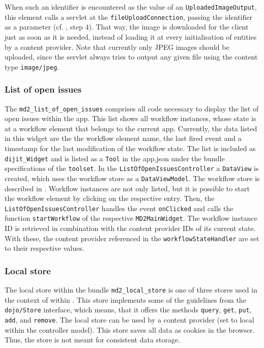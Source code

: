 When such an identifier is encountered as the value of an \lstinline|UploadedImageOutput|, this element calls a servlet at the \lstinline|fileUploadConnection|, passing the identifier as a parameter (cf. , step 4). That way, the image is downloaded for the client just as soon as it is needed, instead of loading it at every initialisation of entities by a content provider. Note that currently only JPEG images should be uploaded, since the servlet always tries to output any given file using the content type \lstinline|image/jpeg|.



\subsubsection{List of open issues}
\label{sec:listOfOpenIssues}

The \lstinline!md2_list_of_open_issues! comprises all code necessary to display the list of open issues within the app. This list shows all workflow instances, whose state is at a workflow element that belongs to the current app. Currently, the data listed in this widget are the the workflow element name, the last fired event and a timestamp for the last modification of the workflow state. 
The list is included as \lstinline!dijit_Widget! and is listed as a \lstinline!Tool! in the app.json under the bundle specifications of the \lstinline!toolset!. In the \lstinline!ListOfOpenIssuesController! a \lstinline!DataView! is created, which uses the workflow store as a \lstinline!DataViewModel!. The workflow store is described in .
Workflow instances are not only listed, but it is possible to start the workflow element by clicking on the respective entry. Then, the \lstinline!ListOfOpenIssuesController! handles the event \lstinline!onClicked! and calls the function \lstinline!startWorkflow! of the respective \lstinline!MD2MainWidget!. The workflow instance ID is retrieved in combination with the content provider IDs of its current state. With these, the content provider referenced in the \lstinline!workflowStateHandler! are set to their respective values.

\subsubsection{Local store} \label{local_store}



The local store within the bundle \lstinline|md2_local_store| is one of three stores used in the context of \mapapps within \MD. This store implements some of the guidelines from the \lstinline|dojo/Store| interface, which means, that it offers the methods \lstinline|query|, \lstinline|get|, \lstinline|put|, \lstinline|add|, and \lstinline|remove|.
The local store can be used by a content provider (set to local within the controller model). This store saves all data as cookies in the browser. Thus, the store is not meant for consistent data storage.


